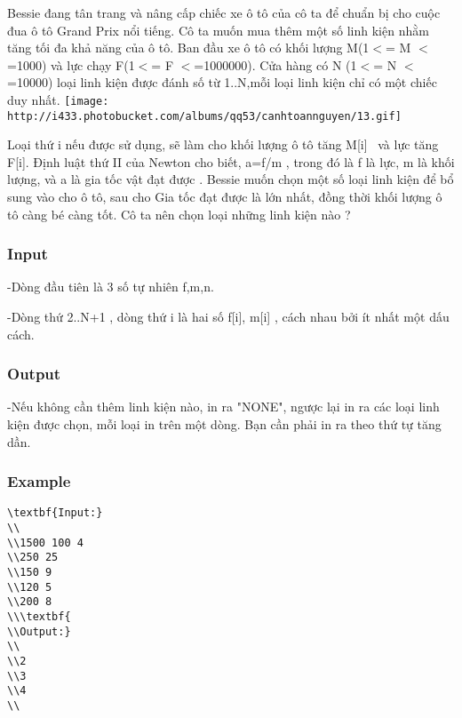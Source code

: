 



   Bessie đang tân trang và nâng cấp chiếc xe ô tô của cô ta để chuẩn bị cho cuộc đua ô tô Grand Prix nổi tiếng. Cô ta muốn mua thêm một số linh kiện nhằm tăng tối đa khả năng của ô tô. Ban đầu xe ô tô có khối lượng M(1$<$= M $<$=1000) và lực chạy F(1$<$= F $<$=1000000). Cửa hàng có N (1$<$= N $<$=10000) loại linh kiện được đánh số từ 1..N,mỗi loại linh kiện chỉ có một chiếc duy nhất.   
\texttt{[image: http://i433.photobucket.com/albums/qq53/canhtoannguyen/13.gif]}

   Loại thứ i nếu được sử dụng, sẽ làm cho khối lượng ô tô tăng M[i]  và lực tăng F[i]. Định luật thứ II của Newton cho biết, a=f/m , trong đó là f là lực, m là khối lượng, và a là gia tốc vật đạt được . Bessie muốn chọn một số loại linh kiện để bổ sung vào cho ô tô, sau cho Gia tốc đạt được là lớn nhất, đồng thời khối lượng ô tô càng bé càng tốt. Cô ta nên chọn loại những linh kiện nào ?  

\subsubsection{   Input  }

   -Dòng đầu tiên là 3 số tự nhiên f,m,n.  

   -Dòng thứ 2..N+1 , dòng thứ i là hai số f[i], m[i] , cách nhau bởi ít nhất một dấu cách.  

\subsubsection{   Output  }

   -Nếu không cần thêm linh kiện nào, in ra "NONE", ngược lại in ra các loại linh kiện được chọn, mỗi loại in trên một dòng. Bạn cần phải in ra theo thứ tự tăng dần.  

\subsubsection{   Example  }
\begin{verbatim}
\textbf{Input:}
\\
\\1500 100 4
\\250 25
\\150 9
\\120 5
\\200 8
\\\textbf{
\\Output:}
\\
\\2
\\3
\\4
\\\end{verbatim}